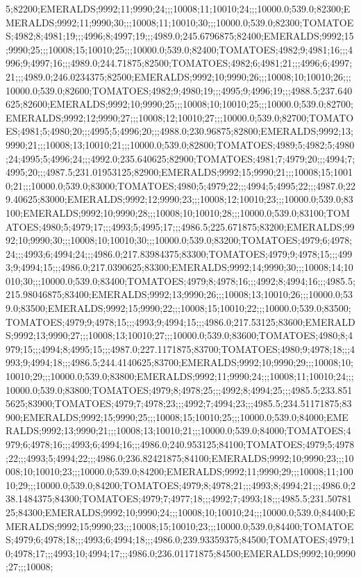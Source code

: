 5;82200;EMERALDS;9992;11;9990;24;;;10008;11;10010;24;;;10000.0;539.0;82300;EMERALDS;9992;11;9990;30;;;10008;11;10010;30;;;10000.0;539.0;82300;TOMATOES;4982;8;4981;19;;;4996;8;4997;19;;;4989.0;245.6796875;82400;EMERALDS;9992;15;9990;25;;;10008;15;10010;25;;;10000.0;539.0;82400;TOMATOES;4982;9;4981;16;;;4996;9;4997;16;;;4989.0;244.71875;82500;TOMATOES;4982;6;4981;21;;;4996;6;4997;21;;;4989.0;246.0234375;82500;EMERALDS;9992;10;9990;26;;;10008;10;10010;26;;;10000.0;539.0;82600;TOMATOES;4982;9;4980;19;;;4995;9;4996;19;;;4988.5;237.640625;82600;EMERALDS;9992;10;9990;25;;;10008;10;10010;25;;;10000.0;539.0;82700;EMERALDS;9992;12;9990;27;;;10008;12;10010;27;;;10000.0;539.0;82700;TOMATOES;4981;5;4980;20;;;4995;5;4996;20;;;4988.0;230.96875;82800;EMERALDS;9992;13;9990;21;;;10008;13;10010;21;;;10000.0;539.0;82800;TOMATOES;4989;5;4982;5;4980;24;4995;5;4996;24;;;4992.0;235.640625;82900;TOMATOES;4981;7;4979;20;;;4994;7;4995;20;;;4987.5;231.01953125;82900;EMERALDS;9992;15;9990;21;;;10008;15;10010;21;;;10000.0;539.0;83000;TOMATOES;4980;5;4979;22;;;4994;5;4995;22;;;4987.0;229.40625;83000;EMERALDS;9992;12;9990;23;;;10008;12;10010;23;;;10000.0;539.0;83100;EMERALDS;9992;10;9990;28;;;10008;10;10010;28;;;10000.0;539.0;83100;TOMATOES;4980;5;4979;17;;;4993;5;4995;17;;;4986.5;225.671875;83200;EMERALDS;9992;10;9990;30;;;10008;10;10010;30;;;10000.0;539.0;83200;TOMATOES;4979;6;4978;24;;;4993;6;4994;24;;;4986.0;217.83984375;83300;TOMATOES;4979;9;4978;15;;;4993;9;4994;15;;;4986.0;217.0390625;83300;EMERALDS;9992;14;9990;30;;;10008;14;10010;30;;;10000.0;539.0;83400;TOMATOES;4979;8;4978;16;;;4992;8;4994;16;;;4985.5;215.98046875;83400;EMERALDS;9992;13;9990;26;;;10008;13;10010;26;;;10000.0;539.0;83500;EMERALDS;9992;15;9990;22;;;10008;15;10010;22;;;10000.0;539.0;83500;TOMATOES;4979;9;4978;15;;;4993;9;4994;15;;;4986.0;217.53125;83600;EMERALDS;9992;13;9990;27;;;10008;13;10010;27;;;10000.0;539.0;83600;TOMATOES;4980;8;4979;15;;;4994;8;4995;15;;;4987.0;227.1171875;83700;TOMATOES;4980;9;4978;18;;;4993;9;4994;18;;;4986.5;244.4140625;83700;EMERALDS;9992;10;9990;29;;;10008;10;10010;29;;;10000.0;539.0;83800;EMERALDS;9992;11;9990;24;;;10008;11;10010;24;;;10000.0;539.0;83800;TOMATOES;4979;8;4978;25;;;4992;8;4994;25;;;4985.5;233.8515625;83900;TOMATOES;4979;7;4978;23;;;4992;7;4994;23;;;4985.5;234.51171875;83900;EMERALDS;9992;15;9990;25;;;10008;15;10010;25;;;10000.0;539.0;84000;EMERALDS;9992;13;9990;21;;;10008;13;10010;21;;;10000.0;539.0;84000;TOMATOES;4979;6;4978;16;;;4993;6;4994;16;;;4986.0;240.953125;84100;TOMATOES;4979;5;4978;22;;;4993;5;4994;22;;;4986.0;236.82421875;84100;EMERALDS;9992;10;9990;23;;;10008;10;10010;23;;;10000.0;539.0;84200;EMERALDS;9992;11;9990;29;;;10008;11;10010;29;;;10000.0;539.0;84200;TOMATOES;4979;8;4978;21;;;4993;8;4994;21;;;4986.0;238.1484375;84300;TOMATOES;4979;7;4977;18;;;4992;7;4993;18;;;4985.5;231.5078125;84300;EMERALDS;9992;10;9990;24;;;10008;10;10010;24;;;10000.0;539.0;84400;EMERALDS;9992;15;9990;23;;;10008;15;10010;23;;;10000.0;539.0;84400;TOMATOES;4979;6;4978;18;;;4993;6;4994;18;;;4986.0;239.93359375;84500;TOMATOES;4979;10;4978;17;;;4993;10;4994;17;;;4986.0;236.01171875;84500;EMERALDS;9992;10;9990;27;;;10008;